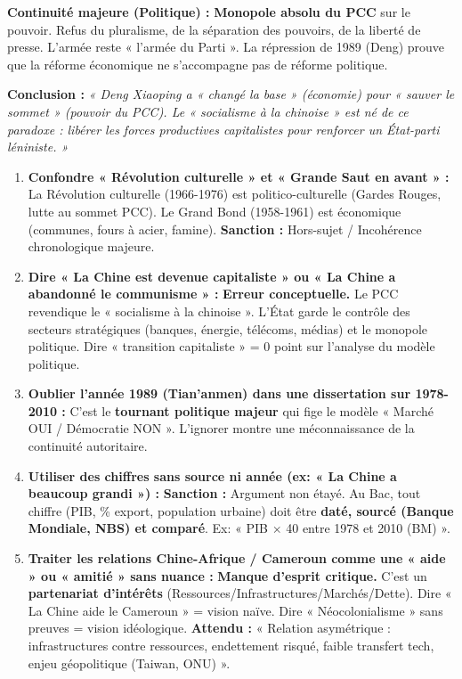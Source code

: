 \documentclass[11pt]{article}
\begin{document}
\begin{exoresolu}
\textbf{Continuité majeure (Politique) :} \textbf{Monopole absolu du PCC} sur le pouvoir. Refus du pluralisme, de la séparation des pouvoirs, de la liberté de presse. L'armée reste « l'armée du Parti ». La répression de 1989 (Deng) prouve que la réforme économique ne s'accompagne pas de réforme politique.

\textbf{Conclusion :} \emph{« Deng Xiaoping a « changé la base » (économie) pour « sauver le sommet » (pouvoir du PCC). Le « socialisme à la chinoise » est né de ce paradoxe : libérer les forces productives capitalistes pour renforcer un État-parti léniniste. »}
\end{exoresolu}

\begin{attention}
\begin{enumerate}
    \item \textbf{Confondre « Révolution culturelle » et « Grande Saut en avant » :} La Révolution culturelle (1966-1976) est politico-culturelle (Gardes Rouges, lutte au sommet PCC). Le Grand Bond (1958-1961) est économique (communes, fours à acier, famine). \textbf{Sanction :} Hors-sujet / Incohérence chronologique majeure.
    \item \textbf{Dire « La Chine est devenue capitaliste » ou « La Chine a abandonné le communisme » :} \textbf{Erreur conceptuelle.} Le PCC revendique le « socialisme à la chinoise ». L'État garde le contrôle des secteurs stratégiques (banques, énergie, télécoms, médias) et le monopole politique. Dire « transition capitaliste » = 0 point sur l'analyse du modèle politique.
    \item \textbf{Oublier l'année 1989 (Tian'anmen) dans une dissertation sur 1978-2010 :} C'est le \textbf{tournant politique majeur} qui fige le modèle « Marché OUI / Démocratie NON ». L'ignorer montre une méconnaissance de la continuité autoritaire.
    \item \textbf{Utiliser des chiffres sans source ni année (ex: « La Chine a beaucoup grandi ») :} \textbf{Sanction :} Argument non étayé. Au Bac, tout chiffre (PIB, \% export, population urbaine) doit être \textbf{daté, sourcé (Banque Mondiale, NBS) et comparé}. Ex: « PIB $\times$ 40 entre 1978 et 2010 (BM) ».
    \item \textbf{Traiter les relations Chine-Afrique / Cameroun comme une « aide » ou « amitié » sans nuance :} \textbf{Manque d'esprit critique.} C'est un \textbf{partenariat d'intérêts} (Ressources/Infrastructures/Marchés/Dette). Dire « La Chine aide le Cameroun » = vision naïve. Dire « Néocolonialisme » sans preuves = vision idéologique. \textbf{Attendu :} « Relation asymétrique : infrastructures contre ressources, endettement risqué, faible transfert tech, enjeu géopolitique (Taiwan, ONU) ».
\end{enumerate}
\end{attention}
\end{document}
